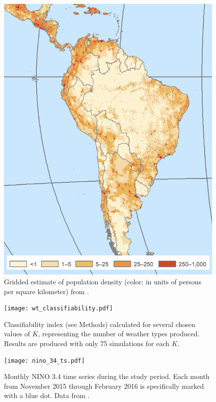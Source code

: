 \documentclass{article}
\begin{document}
\clearpage

\begin{figure}
	\centering
  \includegraphics[width=\textwidth,height=0.6\textheight,keepaspectratio=true]{gpw-v4-2015.png}
	\caption{
		Gridded estimate of population density (color; in units of persons per square kilometer) from \citet{GPWv4}.
	}
\end{figure}

\begin{figure}
	\texttt{[image: wt\_classifiability.pdf]}
	\caption{
		Classifiability index (see Methods) calculated for several chosen values of $K$, representing the number of weather types produced.
		Results are produced with only 75 simulations for each $K$.
	}
\end{figure}

\begin{figure}
	\texttt{[image: nino\_34\_ts.pdf]}
	\caption{
		Monthly NINO 3.4 time series during the study period.
		Each month from November 2015 through February 2016 is specifically marked with a blue dot.
		Data from \citet{Kaplan1998}.
	}
\end{figure}
\end{document}
